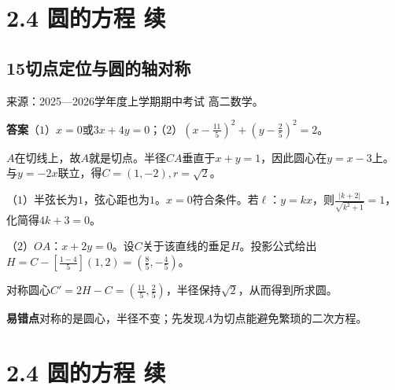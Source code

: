 \documentclass[UTF8,11pt,a4paper,fontset=windows]{ctexart}
\newcommand{\qhead}[2]{\subsection{#1\texorpdfstring{\quad}{ }#2}}
\newcommand{\qsource}[1]{{\footnotesize 来源：#1。\par}}
\begin{document}
\clearpage

\section{2.4 圆的方程 续}

\qhead{15}{切点定位与圆的轴对称}
\qsource{2025—2026学年度上学期期中考试 高二数学}
\textbf{答案}\quad （\(1\)）\(x= 0\)或\(3x+ 4y= 0\)；（\(2\)）\(\left(x- \frac{11}{5}\right)^{2}+ \left(y- \frac{2}{5}\right)^{2}= 2\)。\par
\(A\)在切线上，故\(A\)就是切点。半径\(CA\)垂直于\(x+ y= 1\)，因此圆心在\(y= x- 3\)上。与\(y= - 2x\)联立，得\(C= \left(1,\allowbreak - 2\right),\allowbreak r= \sqrt{2}\)。\par
（\(1\)）半弦长为\(1\)，弦心距也为\(1\)。\(x= 0\)符合条件。若\(\ell \)：\(y= kx\)，则\(\frac{\lvert k+ 2\rvert }{\sqrt{k^{2}+ 1}}= 1\)，化简得\(4k+ 3= 0\)。\par
（\(2\)）\(OA\)：\(x+ 2y= 0\)。设\(C\)关于该直线的垂足\(H\)。投影公式给出\(H= C- \left[\frac{1- 4}{5}\right]\left(1,\allowbreak 2\right)= \left(\frac{8}{5},\allowbreak - \frac{4}{5}\right)\)。\par
对称圆心\(C'= 2H- C= \left(\frac{11}{5},\allowbreak \frac{2}{5}\right)\)，半径保持\(\sqrt{2}\)，从而得到所求圆。\par
{\small\textbf{易错点}\quad 对称的是圆心，半径不变；先发现\(A\)为切点能避免繁琐的二次方程。\par}

\clearpage

\section{2.4 圆的方程 续}
\end{document}

